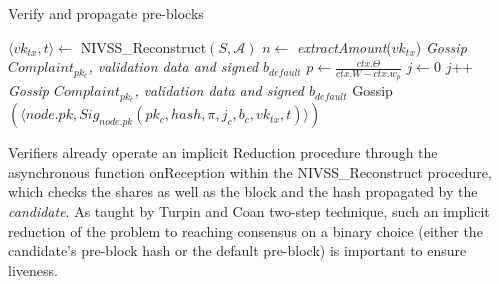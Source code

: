     \begin{algorithm}
        \caption{Verify and propagate pre-blocks}
        \begin{algorithmic}[1]
                \State $\langle vk_{tx}, t\rangle \leftarrow$ NIVSS\_Reconstruct$(S, \mathcal{A})$
                \State $n \leftarrow $ \textit{extractAmount}($vk_{tx}$)
                    \State \textit{Gossip $Complaint_{pk_c}$, validation data and signed $b_{default}$}
                    \Break
                \EndIf
                \State $p \leftarrow \frac{ctx.\Theta}{ctx.W-ctx.w_p}$
                \State $j \leftarrow 0$
                \While{$\frac{hash}{2^{len(hash)}} \notin [ \sum_{k=0}^j Pr(k;n,p), \sum_{k=0}^{j+1} Pr(k;n,p) )$}
                    \State $j$++
                \EndWhile
                \State \textit{Gossip $Complaint_{pk_c}$, validation data and signed $b_{default}$}
                \Break
                \EndIf
            \State Gossip$(\langle node.pk, Sig_{node.pk}(pk_c, hash, \pi, j_{c}, b_{c}, vk_{tx}, t) \rangle)$
            \EndProcedure
        \end{algorithmic}
    \end{algorithm}

Verifiers already operate an implicit \textrm{Reduction} procedure
through the asynchronous function \textrm{onReception} within the
\textrm{NIVSS\_Reconstruct} procedure, which checks the shares as
well as the block and the hash propagated by the \emph{candidate}. As
taught by Turpin and Coan \cite{ebiza} two-step technique, such an implicit reduction of the problem
to reaching consensus on a binary choice (either the candidate's
pre-block hash or the default pre-block) is important to ensure
liveness.

